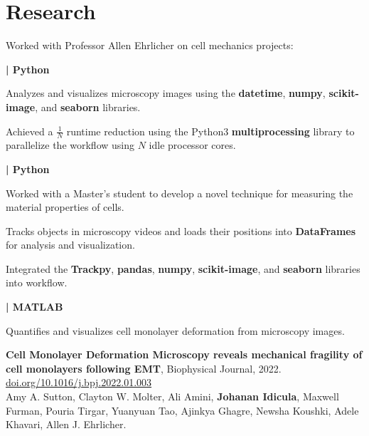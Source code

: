 \documentclass[]{jidicula-resume}
\begin{document}
\section{Research}
Worked with Professor Allen Ehrlicher on cell mechanics projects:

\textbf{| Python}
\begin{tightemize}
\item Analyzes and visualizes microscopy images using the \textbf{datetime},
  \textbf{numpy}, \textbf{scikit-image}, and \textbf{seaborn} libraries.
\item Achieved a $\frac{1}{N}$ runtime reduction using the Python3 \textbf{multiprocessing} library to parallelize the workflow using $N$ idle processor cores.
\end{tightemize}
\sectionsep{}
\textbf{| Python}
\begin{tightemize}
  
\item Worked with a Master's student to develop a novel technique for measuring the material properties of cells.

\item Tracks objects in microscopy videos and loads their
  positions into \textbf{DataFrames} for analysis and visualization.
\item Integrated the \textbf{Trackpy}, \textbf{pandas}, \textbf{numpy},
  \textbf{scikit-image}, and \textbf{seaborn} libraries into workflow.
\end{tightemize}
\sectionsep{}
\textbf{| MATLAB}
\begin{tightemize}
\item Quantifies and visualizes cell monolayer deformation from microscopy
  images.
\item \textbf{Cell Monolayer Deformation Microscopy reveals mechanical fragility of cell monolayers following EMT}, Biophysical Journal, 2022. \href{https://doi.org/10.1016/j.bpj.2022.01.003}{doi.org/10.1016/j.bpj.2022.01.003}\\
  Amy A. Sutton, Clayton W. Molter, Ali Amini, \textbf{Johanan Idicula},
  Maxwell Furman, Pouria Tirgar, Yuanyuan Tao, Ajinkya Ghagre, Newsha Koushki, Adele Khavari, Allen J. Ehrlicher.

\end{tightemize}
\sectionsep{}
\end{document}
